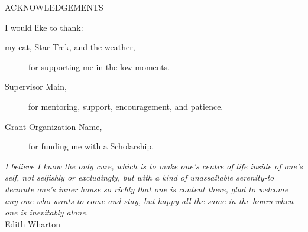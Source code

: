 \newpage
{}

\begin{center}
ACKNOWLEDGEMENTS
\end{center}

\noindent I would like to thank:
\begin{description}
\item[my cat, Star Trek, and the weather,]
	for supporting me in the low moments.
\item[Supervisor Main,]
	for  mentoring, support, encouragement, and patience.
\item[Grant Organization Name,]
	for funding me with a Scholarship.
\end{description}

\begin{flushright}
\textit{I believe I know the only cure, which is to make
one's centre of life inside of one's self, not
selfishly or excludingly, but with a kind of
unassailable serenity-to decorate one's inner house
so richly that one is content there, glad to welcome
any one who wants to come and stay, but happy all
the same in the hours when one is inevitably alone.}
\\
Edith Wharton \\
\end{flushright}
